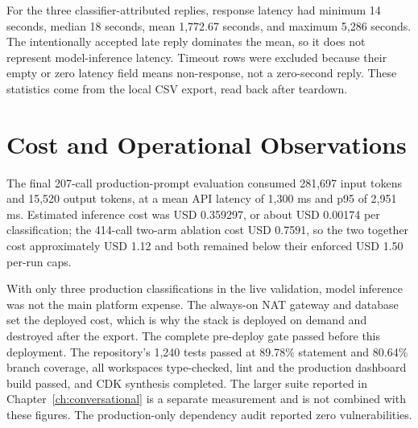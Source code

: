 For the three classifier-attributed replies, response latency had minimum 14
seconds, median 18 seconds, mean 1,772.67 seconds, and maximum 5,286 seconds.
The intentionally accepted late reply dominates the mean, so it does not
represent model-inference latency. Timeout rows were excluded because their
empty or zero latency field means non-response, not a zero-second reply. These
statistics come from the local CSV export, read back after teardown.

\section{Cost and Operational Observations}

The final 207-call production-prompt evaluation consumed 281,697 input tokens
and 15,520 output tokens, at a mean API latency of 1,300 ms and p95 of
2,951 ms. Estimated inference cost was USD 0.359297, or about USD 0.00174 per
classification; the 414-call two-arm ablation cost USD 0.7591, so the two
together cost approximately USD 1.12 and both remained below their enforced USD
1.50 per-run caps.

With only three production classifications in the live validation, model
inference was not the main platform expense. The always-on NAT gateway and
database set the deployed cost, which is why the stack is deployed on demand and
destroyed after the export. The complete pre-deploy gate passed before this
deployment. The repository's 1,240 tests passed at 89.78\% statement and 80.64\%
branch coverage, all workspaces type-checked, lint and the production dashboard
build passed, and CDK synthesis completed. The larger suite reported in
Chapter~\ref{ch:conversational} is a separate measurement and is not combined
with these figures. The production-only dependency audit reported zero
vulnerabilities.
